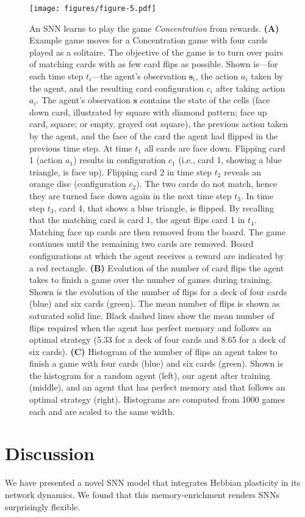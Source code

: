 \documentclass{article}
\newcommand{\vm}[1]{\bm{#1}}
\begin{document}
\begin{figure}\centering
\texttt{[image: figures/figure-5.pdf]}
\caption{An SNN learns to play the game \emph{Concentration} from rewards.
\textbf{(A)} Example game moves for a Concentration game with four cards played as a solitaire. The objective of the game is to turn over pairs of matching cards with as few card flips as possible.
Shown is---for each time step $t_i$---the agent's observation $\vm{s}_i$, the action $a_i$ taken by the agent, and the resulting card configuration $c_i$ after taking action $a_i$. The agent's observation $\vm{s}$ contains the state of the cells (face down card, illustrated by square with diamond pattern; face up card, square; or empty, grayed out square), the previous action taken by the agent, and the face of the card the agent had flipped in the previous time step. At time $t_1$ all cards are face down.
Flipping card \num{1} (action $a_1$) results in configuration $c_1$ (i.e., card \num{1}, showing a blue triangle, is face up).
Flipping card \num{2} in time step $t_2$ reveals an orange disc (configuration $c_2$). The two cards do not match, hence they are turned face down again in the next time step $t_3$.
In time step $t_3$, card \num{4}, that shows a blue triangle, is flipped. By recalling that the matching card is card \num{1}, the agent flips card \num{1} in $t_4$. Matching face up cards are then removed from the board. The game continues until the remaining two cards are removed. Board configurations at which the agent receives a reward are indicated by a red rectangle.
\textbf{(B)} Evolution of the number of card flips the agent takes to finish a game over the number of games during training. Shown is the evolution of the number of flips for a deck of four cards (blue) and six cards (green). The mean number of flips is shown as saturated solid line. Black dashed lines show the mean number of flips required when the agent has perfect memory and follows an optimal strategy (\num{5.33} for a deck of four cards and \num{8.65} for a deck of six cards).
\textbf{(C)} Histogram of the number of flips an agent takes to finish a game with four cards (blue) and six cards (green). Shown is the histogram for a random agent (left), our agent after training (middle), and an agent that has perfect memory and that follows an optimal strategy (right). Histograms are computed from \num{1000} games each and are scaled to the same width.
}
\label{fig:fig5}
\end{figure}



\section{Discussion}
We have presented a novel SNN model that integrates Hebbian plasticity in its network dynamics. We found that this memory-enrichment renders SNNs surprisingly flexible.
\end{document}
